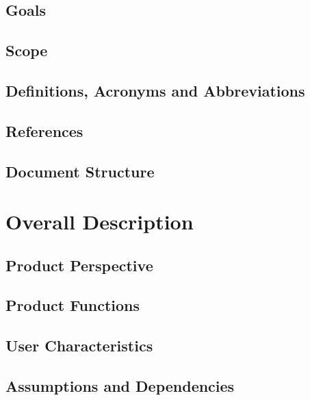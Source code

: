 \documentclass[a4paper,12pt]{report}
\begin{document}
	\section{Goals}
	

	\section{Scope}
	

	\section{Definitions, Acronyms and Abbreviations}
	

	\section{References}
	

	\section{Document Structure}
	

	\chapter{Overall Description}
	\label{ch:Overall_Description}

	\section{Product Perspective}
	

	\section{Product Functions}
	

	\section{User Characteristics}
	

	\section{Assumptions and Dependencies}
	
\end{document}
